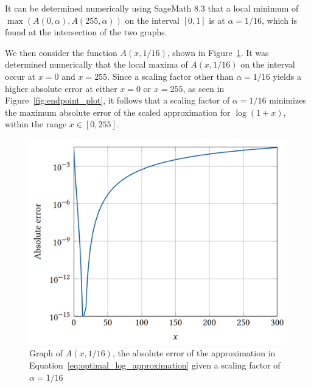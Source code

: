It can be determined numerically using SageMath 8.3 that a local minimum of $\max\left(A\left(0,\alpha\right),A\left(255,\alpha\right)\right)$ on the interval $[0,1]$ is at $\alpha = 1/16$, which is found at the intersection of the two graphs.

We then consider the function $A\left(x,1/16\right)$, shown in Figure~\ref{fig:single_alpha_plot}.
It was determined numerically that the local maxima of $A\left(x,1/16\right)$ on the interval occur at $x=0$ and $x=255$. Since a scaling factor other than $\alpha=1/16$ yields a higher absolute error at either $x=0$ or $x=255$, as seen in Figure~\ref{fig:endpoint_plot}, it follows that a scaling factor of $\alpha = 1/16$ minimizes the maximum absolute error of the scaled approximation for $\log{\left(1+x\right)}$, within the range $x \in [0, 255]$.
\begin{figure}[ht]
	\centering
    \includegraphics[width=12cm]{figures/graph_approx_16.png}
	\caption{Graph of $A\left(x,1/16\right)$, the absolute error of the approximation in Equation~\ref{eq:optimal_log_approximation} given a scaling factor of $\alpha=1/16$}
	\label{fig:single_alpha_plot}
\end{figure}

